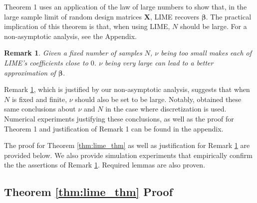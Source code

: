 \documentclass[mnsc,blindrev]{informs3}
\newtheorem{remark2}[thm]{Remark}
\begin{document}
             Theorem 1 uses an application of the law of large numbers to show that, in the large sample limit of random design matrices $\mathbf{X}$, LIME recovers $\boldsymbol{\beta}$. The practical implication of this theorem is that, when using LIME, $N$ should be large.  For a non-asymptotic analysis, see the Appendix. %

            \begin{remark2}
                \label{nu_remark}
                Given a fixed number of samples $N$, $\nu$ being too small makes each of LIME's coefficients close to $0$. $\nu$ being very large can lead to a better approximation of $\boldsymbol{\beta}$. 
            \end{remark2}

            Remark \ref{nu_remark}, which is justified by our non-asymptotic analysis, suggests that when $N$ is fixed and finite, $\nu$  should also be set to be large. Notably, \citep{garreau20theoretical} obtained these same conclusions about $\nu$ and $N$ in the case where discretization is used. Numerical experiments justifying these conclusions, as well as the proof for Theorem 1 and justification of Remark 1 can be found in the appendix. 


   
    
    
        
        The proof for Theorem \ref{thm:lime_thm} as well as justification for Remark \ref{nu_remark} are provided below. We also provide simulation experiments that empirically confirm the the assertions of Remark \ref{nu_remark}. Required lemmas are also proven.
        
         \subsection{Theorem  
        \ref{thm:lime_thm} Proof}
\end{document}

